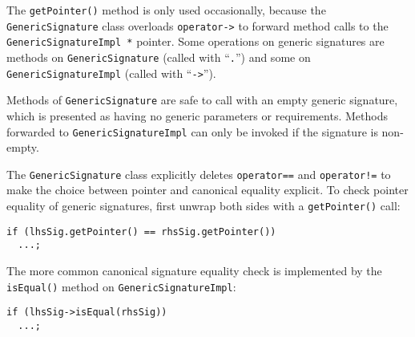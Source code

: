 \documentclass[../generics]{subfiles}
\begin{document}
The \texttt{getPointer()} method is only used occasionally, because the \texttt{GenericSignature} class overloads \texttt{operator->} to forward method calls to the \texttt{GenericSignatureImpl *} pointer. Some operations on generic signatures are methods on \texttt{GenericSignature} (called with ``\texttt{.}'') and some on \texttt{GenericSignatureImpl} (called with ``\texttt{->}'').

Methods of \texttt{GenericSignature} are safe to call with an empty generic signature, which is presented as having no generic parameters or requirements. Methods forwarded to \texttt{GenericSignatureImpl} can only be invoked if the signature is non-empty.

The \texttt{GenericSignature} class explicitly deletes \texttt{operator==} and \texttt{operator!=} to make the choice between pointer and canonical equality explicit. To check pointer equality of generic signatures, first unwrap both sides with a \texttt{getPointer()} call:
\begin{Verbatim}
if (lhsSig.getPointer() == rhsSig.getPointer())
  ...;
\end{Verbatim}
The more common canonical signature equality check is implemented by the \texttt{isEqual()} method on \texttt{GenericSignatureImpl}:
\begin{Verbatim}
if (lhsSig->isEqual(rhsSig))
  ...;
\end{Verbatim}
\end{document}
